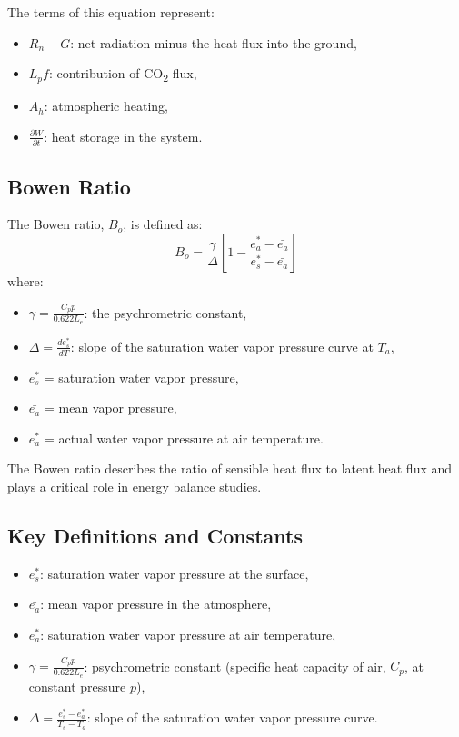 \documentclass[11pt]{article}
\begin{document}
	The terms of this equation represent:
	\begin{itemize}
		\item $R_n - G$: net radiation minus the heat flux into the ground,
		\item $L_p f$: contribution of CO\textsubscript{2} flux,
		\item $A_h$: atmospheric heating,
		\item $\frac{\partial W}{\partial t}$: heat storage in the system.
	\end{itemize}
	
	\subsection*{Bowen Ratio}
	The Bowen ratio, $B_o$, is defined as:
	\begin{equation}
		B_o = \frac{\gamma}{\Delta} \left[ 1 - \frac{e_a^* - \bar{e_a}}{e_s^* - \bar{e_a}} \right] \tag{4.21}
	\end{equation}
	where:
	\begin{itemize}
		\item $\gamma = \frac{C_p p}{0.622 L_e}$: the psychrometric constant,
		\item $\Delta = \frac{de_s^*}{dT}$: slope of the saturation water vapor pressure curve at $T_a$,
		\item $e_s^*$ = saturation water vapor pressure,
		\item $\bar{e_a}$ = mean vapor pressure,
		\item $e_a^*$ = actual water vapor pressure at air temperature.
	\end{itemize}
	
	The Bowen ratio describes the ratio of sensible heat flux to latent heat flux and plays a critical role in energy balance studies.
	
	\subsection*{Key Definitions and Constants}
	\begin{itemize}
		\item $e_s^*$: saturation water vapor pressure at the surface,
		\item $\bar{e_a}$: mean vapor pressure in the atmosphere,
		\item $e_a^*$: saturation water vapor pressure at air temperature,
		\item $\gamma = \frac{C_p p}{0.622 L_e}$: psychrometric constant (specific heat capacity of air, $C_p$, at constant pressure $p$),
		\item $\Delta = \frac{e_s^* - e_a^*}{T_s - T_a}$: slope of the saturation water vapor pressure curve.
	\end{itemize}
	
\end{document}
